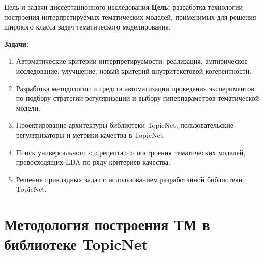 \begin{frame}[t]{Цель и задачи диссертационного исследования}
\textbf{Цель:} разработка технологии построения интерпретируемых  тематических моделей, применимых для решения широкого класса задач тематического моделирования.

\bigskip
\textbf{Задачи:}
\begin{enumerate}
    \smallskip\item Автоматические критерии интерпретируемости: реализация, эмпирическое исследование, улучшение; новый критерий внутритекстовой когерентности.

    \smallskip\item Разработка методологии и средств автоматизации проведения экспериментов по подбору стратегии регуляризации и выбору гиперпараметров тематической модели.

    \smallskip\item Проектирование архитектуры библиотеки TopicNet; пользовательские регуляризаторы и метрики качества в TopicNet.

    \smallskip\item Поиск универсального <<рецепта>> построения тематических моделей, превосходящих LDA по ряду критериев качества.

    \smallskip\item Решение прикладных задач с использованием разработанной библиотеки TopicNet.

\end{enumerate}
\end{frame}





\section{Методология построения ТМ в библиотеке TopicNet}




